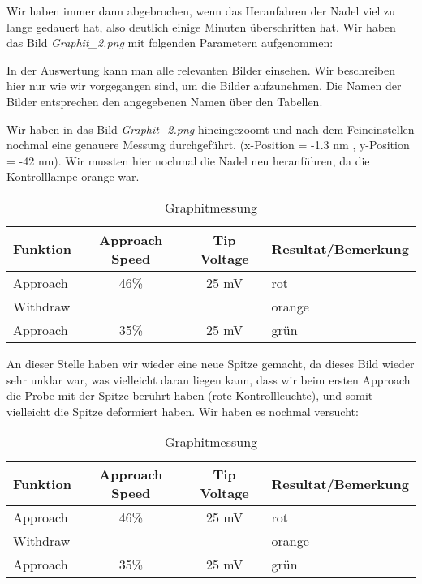 Wir haben immer dann abgebrochen, wenn das Heranfahren der Nadel viel zu lange gedauert hat, also deutlich einige Minuten überschritten hat. Wir haben das Bild \emph{Graphit\_2.png} mit folgenden Parametern aufgenommen: 


In der Auswertung kann man alle relevanten Bilder einsehen. Wir beschreiben hier nur wie wir vorgegangen sind, um die Bilder aufzunehmen. Die Namen der Bilder entsprechen den angegebenen Namen über den Tabellen.

Wir haben in das Bild \emph{Graphit\_2.png} hineingezoomt und nach dem Feineinstellen nochmal eine genauere Messung durchgeführt. (x-Position = -1.3 nm , y-Position = -42 nm). Wir mussten hier nochmal die Nadel neu heranführen, da die Kontrolllampe orange war. 

\begin{table}[H]
\caption{Graphitmessung}
\centering \begin{tabular}[H]{l c c l}
Funktion & Approach Speed & Tip Voltage & Resultat/Bemerkung\\ \hline 
Approach & 46\% & 25 mV & rot\\
Withdraw & & & orange\\
Approach & 35\% & 25 mV & grün\\
\end{tabular}
\end{table}


An dieser Stelle haben wir wieder eine neue Spitze gemacht, da dieses Bild wieder sehr unklar war, was vielleicht daran liegen kann, dass wir beim ersten Approach die Probe mit der Spitze berührt haben (rote Kontrollleuchte), und somit vielleicht die Spitze deformiert haben. Wir haben es nochmal versucht:

\begin{table}[H]
\caption{Graphitmessung}
\centering \begin{tabular}[H]{l c c l} 
Funktion & Approach Speed & Tip Voltage & Resultat/Bemerkung\\ \hline
Approach & 46\% & 25 mV & rot\\
Withdraw & & & orange\\
Approach & 35\% & 25 mV & grün\\
\end{tabular}
\end{table}



